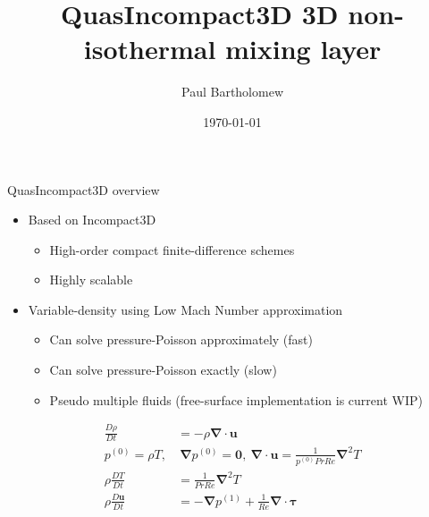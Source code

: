 \documentclass[presentation]{beamer}
\author{Paul Bartholomew}
\date{\today}
\title{QuasIncompact3D 3D non-isothermal mixing layer}
\begin{document}
\maketitle

\begin{frame}[label=sec-1]{QuasIncompact3D overview}
\begin{itemize}
\item Based on Incompact3D
\begin{itemize}
\item High-order compact finite-difference schemes
\item Highly scalable
\end{itemize}
\item Variable-density using Low Mach Number approximation
\begin{itemize}
\item Can solve pressure-Poisson approximately (fast)
\item Can solve pressure-Poisson exactly (slow)
\item Pseudo multiple fluids (free-surface implementation is current WIP)
\end{itemize}
\end{itemize}
\begin{align*}
  \frac{D\rho}{Dt} &= -\rho \boldsymbol{\nabla} \cdot \boldsymbol{u} \\
  p^{\left( 0 \right)} = \rho T,&\ \boldsymbol{\nabla} p^{\left( 0 \right)} = \boldsymbol{0},\ 
                                                             \boldsymbol{\nabla} \cdot
                                                             \boldsymbol{u} = \frac{1}{p^{\left( 0
                                                             \right)} Pr Re} {\boldsymbol{\nabla}}^2
                                                             T \\
  \rho \frac{DT}{Dt} &= \frac{1}{Pr Re} {\boldsymbol{\nabla}}^2 T \\
  \rho \frac{D\boldsymbol{u}}{Dt} &= -\boldsymbol{\nabla} p^{\left( 1 \right)} + \frac{1}{Re}
                                    \boldsymbol{\nabla} \cdot \boldsymbol{\tau} \\
\end{align*}
\end{frame}
\end{document}
